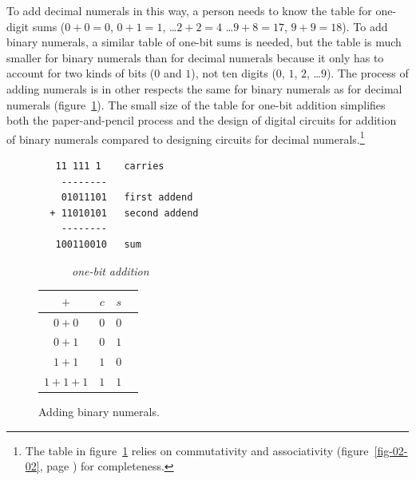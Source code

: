To add decimal numerals in this way, a person needs to know
the table for one-digit sums ($0+0=0$, $0+1=1$, \dots $2+2=4$ \dots $9+8=17$, $9+9=18$).
To add binary numerals, a similar table of one-bit sums is needed,
but the table is much smaller for binary numerals
than for decimal numerals because it only has to account for
two kinds of bits ($0$ and $1$), not ten digits ($0$, $1$, $2$, \dots $9$).
The process of adding numerals is in other respects
the same for binary numerals as for decimal numerals
(figure~\ref{fig:adding-binary-numerals}).
The small size of the table for one-bit addition simplifies
both the paper-and-pencil process and the design of
digital circuits for addition of binary numerals compared to
designing circuits for decimal numerals.\footnote{The table
in figure~\ref{fig:adding-binary-numerals}
relies on commutativity and associativity
(figure~\ref{fig-02-02}, page \pageref{fig-02-02})
for completeness.}

\begin{figure}[!tbp]
\begin{center}
\begin{minipage}[b]{0.4\textwidth}
\begin{verbatim}
   11 111 1    carries
    --------
    01011101   first addend
  + 11010101   second addend
    --------
   100110010   sum
\end{verbatim}
\end{minipage}
\hfill
\begin{minipage}[b]{0.4\textwidth}
~~~~~~\emph{one-bit addition}\\
\vspace{.05 in}
\begin{tabular}{|c|c|c|c}
 \hline
 $+$      & $c$ & $s$ \\
 \hline
 $0+0$    & $0$ & $0$ \\
 \hline
 $0+1$    & $0$ & $1$ \\
 \hline
 $1+1$    & $1$ & $0$ \\
 \hline
 $1+1+1$  & $1$ & $1$ \\
 \hline
\end{tabular}
\end{minipage}
\end{center}
\caption{Adding binary numerals.}
\label{fig:adding-binary-numerals}
\end{figure}

